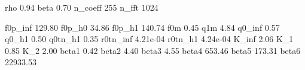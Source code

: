 rho      	     0.94
beta     	     0.70
n_coeff  	      255  
n_fft    	     1024  

f0p_inf  	   129.80
f0p_h0   	    34.86
f0p_h1   	   140.74
f0m      	     0.45
q1m      	     4.84
q0_inf   	     0.57
q0_h1    	     0.50
q0tn_h1  	     0.35
r0tn_inf 	 4.21e-04
r0tn_h1  	 4.24e-04
K_inf    	     2.06
K_1      	     0.85
K_2      	     2.00
beta1    	     0.42
beta2    	     4.40
beta3    	     4.55
beta4    	   653.46
beta5    	   173.31
beta6    	 22933.53
